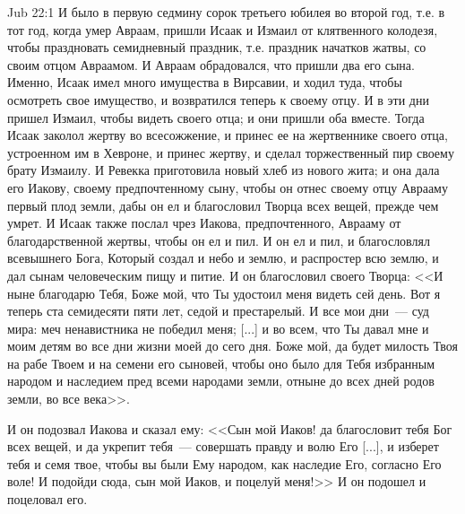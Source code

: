 \vs Jub 22:1
И было в первую седмину сорок третьего юбилея
во второй год, т.е. в тот год, когда умер Авраам,
пришли Исаак и Измаил от клятвенного колодезя,
чтобы праздновать семидневный праздник, т.е.
праздник начатков жатвы, со своим отцом Авраамом.
И Авраам обрадовался, что пришли два его сына.
Именно, Исаак имел много имущества в Вирсавии, и
ходил туда, чтобы осмотреть свое имущество, и
возвратился теперь к своему отцу. И в эти дни
пришел Измаил, чтобы видеть своего отца; и они
пришли оба вместе. Тогда Исаак заколол жертву во
всесожжение, и принес ее на жертвеннике своего
отца, устроенном им в Хевроне, и принес жертву, и
сделал торжественный пир своему брату Измаилу. И
Ревекка приготовила новый хлеб из нового жита; и
она дала его Иакову, своему предпочтенному
сыну, чтобы он отнес своему отцу Аврааму первый
плод земли, дабы он ел и благословил Творца всех
вещей, прежде чем умрет. И Исаак также послал чрез
Иакова, предпочтенного, Аврааму от
благодарственной жертвы, чтобы он ел и пил. И он
ел и пил, и благословлял всевышнего Бога, Который
создал и небо и землю, и распростер всю землю, и
дал сынам человеческим пищу и питие. И он благословил
своего Творца: <<И ныне благодарю Тебя, Боже
мой, что Ты удостоил меня видеть сей день. Вот я
теперь ста семидесяти пяти лет, седой и
престарелый. И все мои дни~--- суд мира: меч
ненавистника не победил меня; [...] и во всем, что Ты
давал мне и моим детям во все дни жизни моей до
сего дня. Боже мой, да будет милость Твоя на рабе
Твоем и на семени его сыновей, чтобы оно было для
Тебя избранным народом и наследием пред всеми
народами земли, отныне до всех дней родов земли,
во все века>>.

И он подозвал Иакова и сказал ему: <<Сын мой
Иаков! да благословит тебя Бог всех вещей, и да
укрепит тебя~--- совершать правду и волю Его [...], и
изберет тебя и семя твое, чтобы вы были Ему
народом, как наследие Его, согласно Его воле! И
подойди сюда, сын мой Иаков, и поцелуй меня!>> И
он подошел и поцеловал его.

